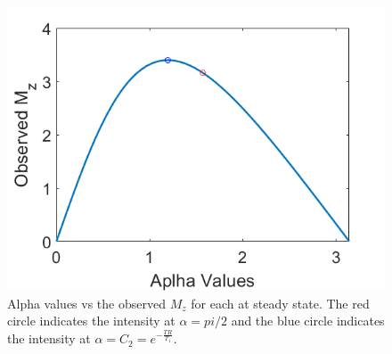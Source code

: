 \documentclass[12pt]{article}
\begin{document}
\begin{figure}[H]
	\centering
	\includegraphics[width=\textwidth]{alphavsmz.png}
	\caption{Alpha values vs the observed $M_z$ for each at steady state. The red circle indicates the intensity at $\alpha = pi/2$ and the blue circle indicates the intensity at $\alpha = C_2 = e^{-\frac{TR}{T_1}}$.}
	\label{Fig:alphas}
\end{figure}

\end{document}
